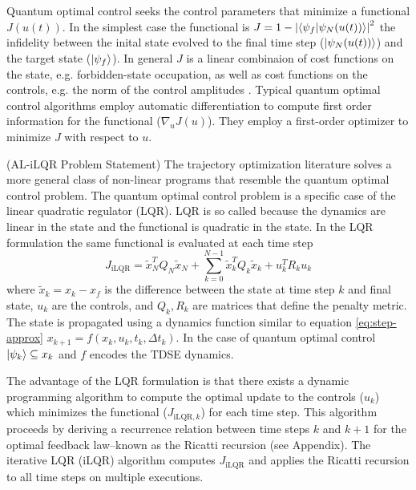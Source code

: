 \documentclass[
  amsfonts,
  amsmath,
  tbtags,
  amssymb,
  aps,
  nobibnotes,
  twocolumn,
]{revtex4-2}
\begin{document}
Quantum optimal control seeks the control
parameters that minimize a functional $J(u(t))$.
In the simplest case the functional is
$J = 1 - {\lvert \braket{\psi_{f} \lvert \psi_{N}(u(t))} \rvert}^{2}$
the infidelity between the inital state evolved
to the final time step ($\ket{\psi_{N}(u(t))}$)
and the target state ($\ket{\psi_{f}}$). In general
$J$ is a linear combinaion of cost functions on the state, e.g.
forbidden-state occupation, as well as
cost functions on the controls, e.g. the norm of the control amplitudes
\cite{leung2017speedup}. Typical quantum optimal control
algorithms employ automatic differentiation
to compute first order information for the functional ($\nabla_{u} J(u)$).
They employ a first-order optimizer to minimize $J$ with respect to $u$.

(AL-iLQR Problem Statement) The trajectory optimization
literature solves a more general class of non-linear programs that resemble
the quantum optimal control problem. The quantum optimal control
problem is a specific case of the linear quadratic regulator (LQR).
LQR is so called because the dynamics are linear in the state and
the functional is quadratic in the state. In the LQR formulation
the same functional is evaluated at each time step
\begin{equation}
  J_{\textrm{iLQR}} = \tilde{x}_{N}^{T} Q_{N} \tilde{x}_{N}
  + \sum_{k = 0}^{N - 1} \tilde{x}_{k}^{T} Q_{k} \tilde{x}_{k} + u_{k}^{T} R_{k} u_{k}
\end{equation}
where $\tilde{x}_{k} = x_{k} - x_{f}$ is the difference between the state
at time step $k$ and final state, $u_{k}$ are the controls,
and $Q_{k}, R_{k}$ are matrices that define the penalty metric.
The state is propagated using a dynamics function similar to
equation \ref{eq:step-approx}
$x_{k + 1} = f(x_{k}, u_{k}, t_{k}, \Delta t_{k})$.
In the case of quantum optimal control $\ket{\psi_{k}} \subseteq x_{k}$
and $f$ encodes the TDSE dynamics.

The advantage of the LQR formulation
is that there exists a dynamic programming algorithm to compute the
optimal update to the controls ($u_{k}$) which minimizes the functional
($J_{\textrm{iLQR}, k}$) for each time step. This algorithm proceeds by deriving a
recurrence relation between time steps $k$ and $k + 1$ for the optimal
feedback law--known as the Ricatti recursion (see Appendix). The
iterative LQR (iLQR) algorithm computes $J_{\textrm{iLQR}}$
and applies the Ricatti recursion to all time steps on multiple
executions.
\end{document}
